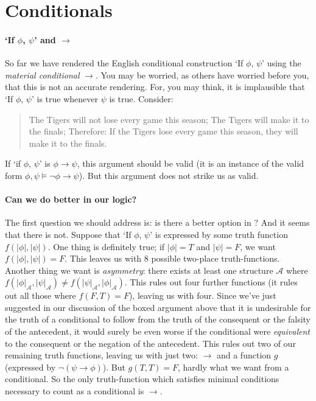 
\section{Conditionals}

\paragraph{`If $\phi$, $\psi$' and $\to$}
So far we have rendered the English conditional construction `If $\phi$, $\psi$' using the \emph{material conditional} $\to$. You may be worried, as others have worried before you, that this is not an accurate rendering. For, you may think, it is implausible that `If $\phi$, $\psi$' is true whenever $\psi$ is true. Consider: 
\begin{quote}
	\begin{exe}
	\ex The Tigers  will not lose every game this season;
	\ex The Tigers will make it to the finals;
	\ex Therefore: If the Tigers lose every game this season, they will make it to the finals.
 \end{exe}
\end{quote}
If `if $\phi$, $\psi$' is $\phi \to \psi$, this argument should be valid (it is an instance of the valid form $\phi,\psi \vDash \neg\phi \to \psi$). But this argument does not strike us as valid. 

\paragraph{Can we do better in our logic?}
The first question we should address is: is there a better option in \lone? And it seems that there is not. Suppose that `If $\phi$, $\psi$' is expressed by some truth function $f(|\phi|,|\psi|)$. One thing is definitely true; if $|\phi|=T$ and $|\psi|=F$, we want $f(|\phi|,|\psi|)=F$. This leaves us with 8 possible two-place truth-functions. Another thing we want is \emph{asymmetry}: there exists at least one structure $\mathscr{A}$ where $f(|\phi|_{\mathscr{A}},|\psi|_{\mathscr{A}})\neq f(|\psi|_{\mathscr{A}},|\phi|_{\mathscr{A}})$. This rules out four further functions (it rules out all those where $f(F,T)=F$), leaving us with four. Since we've just suggested in our discussion of the boxed argument above that it is undesirable for the truth of a conditional to follow from the truth of the consequent or the falsity of the antecedent, it would surely be even worse if the conditional were \emph{equivalent} to the consequent or the negation of the antecedent. This rules out two of our remaining truth functions, leaving us with just two: $\to$ and a function $g$ (expressed by $\neg(\psi\to\phi)$). But $g(T,T)=F$, hardly what we want from a conditional. So the only truth-function which satisfies minimal conditions necessary to count as a conditional is $\to$.

